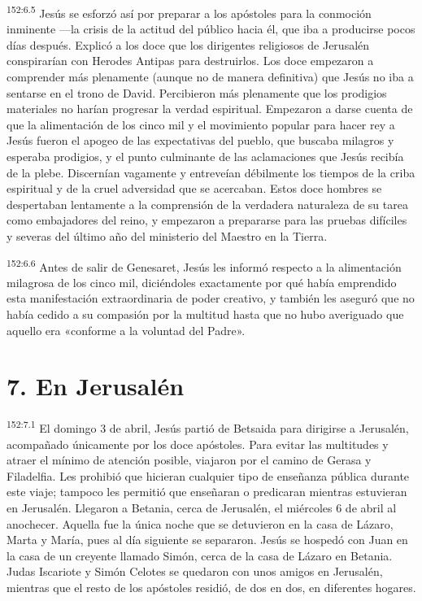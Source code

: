 \par 
\textsuperscript{152:6.5} Jesús se esforzó así por preparar a los apóstoles para la conmoción inminente ---la crisis de la actitud del público hacia él, que iba a producirse pocos días después. Explicó a los doce que los dirigentes religiosos de Jerusalén conspirarían con Herodes Antipas para destruirlos. Los doce empezaron a comprender más plenamente (aunque no de manera definitiva) que Jesús no iba a sentarse en el trono de David. Percibieron más plenamente que los prodigios materiales no harían progresar la verdad espiritual. Empezaron a darse cuenta de que la alimentación de los cinco mil y el movimiento popular para hacer rey a Jesús fueron el apogeo de las expectativas del pueblo, que buscaba milagros y esperaba prodigios, y el punto culminante de las aclamaciones que Jesús recibía de la plebe. Discernían vagamente y entreveían débilmente los tiempos de la criba espiritual y de la cruel adversidad que se acercaban. Estos doce hombres se despertaban lentamente a la comprensión de la verdadera naturaleza de su tarea como embajadores del reino, y empezaron a prepararse para las pruebas difíciles y severas del último año del ministerio del Maestro en la Tierra.

\par 
\textsuperscript{152:6.6} Antes de salir de Genesaret, Jesús les informó respecto a la alimentación milagrosa de los cinco mil, diciéndoles exactamente por qué había emprendido esta manifestación extraordinaria de poder creativo, y también les aseguró que no había cedido a su compasión por la multitud hasta que no hubo averiguado que aquello era «conforme a la voluntad del Padre».

\section*{7. En Jerusalén}
\par 
\textsuperscript{152:7.1} El domingo 3 de abril, Jesús partió de Betsaida para dirigirse a Jerusalén, acompañado únicamente por los doce apóstoles. Para evitar las multitudes y atraer el mínimo de atención posible, viajaron por el camino de Gerasa y Filadelfia. Les prohibió que hicieran cualquier tipo de enseñanza pública durante este viaje; tampoco les permitió que enseñaran o predicaran mientras estuvieran en Jerusalén. Llegaron a Betania, cerca de Jerusalén, el miércoles 6 de abril al anochecer. Aquella fue la única noche que se detuvieron en la casa de Lázaro, Marta y María, pues al día siguiente se separaron. Jesús se hospedó con Juan en la casa de un creyente llamado Simón, cerca de la casa de Lázaro en Betania. Judas Iscariote y Simón Celotes se quedaron con unos amigos en Jerusalén, mientras que el resto de los apóstoles residió, de dos en dos, en diferentes hogares.

